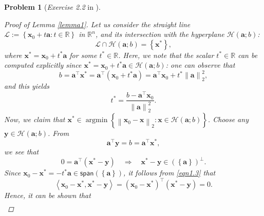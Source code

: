 \documentclass[11pt]{article}
\newtheorem{problem}{Problem}
\DeclareMathOperator*{\argmin}{argmin}
\begin{document}
\begin{problem} [\emph{Exercise 2.2} in \cite{calafiore2014optimization}]
{\begin{proof} [Proof of Lemma \ref{lemma1}]
Let us consider the straight line $\mathcal{L} := \left\{ \mathbf{x}_0 + t \mathbf{a} : t \in \mathbb{R} \right\}$ in $\mathbb{R}^n$, and its intersection with the hyperplane $\mathcal{H}(\mathbf{a}; b)$:
\begin{equation*}
    \mathcal{L} \cap \mathcal{H} (\mathbf{a}; b) = \left\{ \mathbf{x}^* \right\},
\end{equation*}
where $\mathbf{x}^* = \mathbf{x}_0 + t^* \mathbf{a}$ for some $t^* \in \mathbb{R}$. Here, we note that the scalar $t^* \in \mathbb{R}$ can be computed explicitly since $\mathbf{x}^* = \mathbf{x}_0 + t^* \mathbf{a} \in \mathcal{H}(\mathbf{a}; b)$: one can observe that
\begin{equation*}
    b = \mathbf{a}^{\top} \mathbf{x}^* = \mathbf{a}^{\top} \left( \mathbf{x}_0 + t^* \mathbf{a} \right) = \mathbf{a}^{\top} \mathbf{x}_0 + t^* \left\| \mathbf{a} \right\|_{2}^2,
\end{equation*}
and this yields
\begin{equation*}
    t^* = \frac{b - \mathbf{a}^{\top} \mathbf{x}_0}{\left\| \mathbf{a} \right\|_{2}^2}.
\end{equation*}
Now, we claim that $\mathbf{x}^* \in \argmin \left\{ \left\| \mathbf{x}_0 - \mathbf{x} \right\|_2 : \mathbf{x} \in \mathcal{H} (\mathbf{a}; b) \right\}$. Choose any $\mathbf{y} \in \mathcal{H}(\mathbf{a}; b)$. From
\begin{equation*}
    \mathbf{a}^{\top} \mathbf{y} = b = \mathbf{a}^{\top} \mathbf{x}^*,
\end{equation*}
we see that
\begin{equation}
    \label{eqn1.3}
    0 = \mathbf{a}^{\top} \left( \mathbf{x}^* - \mathbf{y} \right) \quad \Rightarrow \quad \mathbf{x}^* - \mathbf{y} \in \left( \left\{ \mathbf{a} \right\} \right)^{\perp}.
\end{equation}
Since $\mathbf{x}_0 - \mathbf{x}^* = - t^* \mathbf{a} \in \textsf{span} \left( \left\{ \mathbf{a} \right\} \right)$, it follows from \eqref{eqn1.3} that
\begin{equation}
    \label{eqn1.4}
    \left\langle \mathbf{x}_0 - \mathbf{x}^*, \mathbf{x}^* - \mathbf{y} \right\rangle = \left( \mathbf{x}_0 - \mathbf{x}^* \right)^{\top} \left( \mathbf{x}^* - \mathbf{y} \right) = 0. 
\end{equation}
Hence, it can be shown that
\begin{equation}
    \label{eqn1.5}
    \begin{split}

\end{split}
\end{equation}
\end{proof}}
\end{problem}
\end{document}
